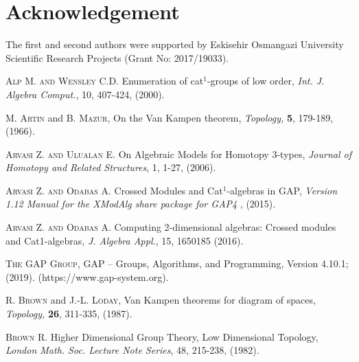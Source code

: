\documentclass[a4paper,11pt]{article}
\theoremstyle{plain}
\theoremstyle{definition}
\begin{document}
\section*{Acknowledgement}

The first and second authors were supported by Eskisehir Osmangazi
University Scientific Research Projects (Grant No: 2017/19033).

\begin{thebibliography}{99}
	 \textsc{Alp M. and Wensley C.D. } Enumeration of cat$^{1}$-groups 
	of low order, \emph{Int. J. Algebra Comput.}, 10, 407-424, (2000).
	
	 \textsc{M. Artin} and \textsc{B. Mazur}, \textrm{On the Van
		Kampen theorem, }\emph{Topology,} \textbf{5}, 179-189, (1966).
	
	 \textsc{Arvasi Z. and Ulualan E.} On Algebraic Models for
	Homotopy 3-types, \emph{Journal of Homotopy and Related Structures}, 1,
	1-27, (2006).
	
	 \textsc{Arvasi Z. and Odabas A.} Crossed Modules and Cat$%
	^1 $-algebras in \textsf{GAP}, \emph{Version 1.12 Manual for the \textsf{%
			XModAlg} share package for \textsf{GAP}4 }, (2015).
	
	 \textsc{Arvasi Z. and Odabas A.} Computing 2-dimensional
	algebras: Crossed modules and Cat1-algebras, \emph{J. Algebra Appl.}, 15,
	1650185 (2016).
	
	 \textsc{The GAP Group},
	GAP -- Groups, Algorithms, and Programming, Version 4.10.1; (2019). (https://www.gap-system.org).
	
	
	
	
	
	
	 \textsc{R. Brown} and \textsc{J.-L. Loday}, \textrm{Van
		Kampen theorems for diagram of spaces, } \emph{Topology,} \textbf{26},
	311-335, (1987).
	
	 \textsc{Brown R.} Higher Dimensional Group Theory, Low
	Dimensional Topology, \emph{London Math. Soc. Lecture Note Series}, 48,
	215-238, (1982).
	

\end{thebibliography}
\end{document}
